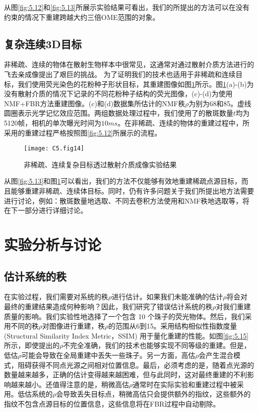 从图\ref{fig:5.12}和\ref{fig:5.13}所展示实验结果可看出，我们的所提出的方法可以在没有约束的情况下重建跨越大约三倍OME范围的对象。

\subsection{复杂连续3D目标}

非稀疏、连续的物体在散射生物样本中很常见，这通常对通过散射介质方法进行的飞去亲成像提出了艰巨的挑战。 为了证明我们的技术也适用于非稀疏和连续目标，我们使用荧光染色的花粉种子形状目标，其重建图像如图\ref{fig:5.14}所示。图\ref{fig:5.14}(a)-(b)为没有散射介质的情况下记录的不同花粉种子结构的荧光图像，(c)-(d)为使用 NMF+FBR方法重建图像。(c)和(d)数据集所估计的NMF秩$\rho$为别为68和85。虚线圆圈表示光学记忆效应范围。两组数据处理过程中，我们使用了的散斑数量$t$均为5120帧，相机的单次曝光时间为$10 ms$。在非稀疏、连续的物体的重建过程中，所采用的重建过程严格按照图\ref{fig:5.12}所展示的流程。

\begin{figure}[htp]
	\centering
	\texttt{[image: C5.fig14]}
	\caption{非稀疏、连续复杂目标透过散射介质成像实验结果}
	\label{fig:5.14}
\end{figure}

从图\ref{fig:5.13}和图\ref{fig:5.14}可以看出，我们的方法不仅能够有效地重建稀疏点源目标，而且能够重建非稀疏、连续体目标。同时，仍有许多问题关于我们所提出地方法需要进行讨论，例如：散斑数量地选取、不同去卷积方法使用和NMF秩地选取等，将在下一部分进行详细讨论。

\section{实验分析与讨论}

\subsection{估计系统的秩}
在实验过程，我们需要对系统的秩$\rho$进行估计。如果我们未能准确的估计$\rho$将会对最终的重建结果造成何种影响？因此，我们研究了错误估计系统的秩$\rho$对我们重建质量的影响。我们实验性地选择了一个包含 10 个珠子的荧光物体。然后，我们采用不同的秩$\rho$对图像进行重建，秩$\rho$的范围从6到15。采用结构相似性指数度量 (Structural Similarity Index Metric，SSIM) \cite{Daoud2017} 用于量化重建的性能。如图\ref{fig:5.15} 所示，即使提出的$\rho$不完全准确，我们的技术也能够实现不同等级的重建。但是，低估$\rho$可能会导致在全局重建中丢失一些珠子。另一方面，高估$\rho$会产生混合模式，阻碍获得不同点光源之间相对位置信息。最后，必须考虑的是，随着点光源的数量越来越多，正确的估计变得越来越困难，但与此同时，这对最终重建的不利影响越来越小。还值得注意的是，稍微高估$\rho$通常时在实际实验和重建过程中被采用。低估系统的$\rho$会导致丢失目标点，稍微高估只会提供额外的指纹，这些额外的指纹不包含点源目标的位置信息，这些信息将在FBR过程中自动剔除。

